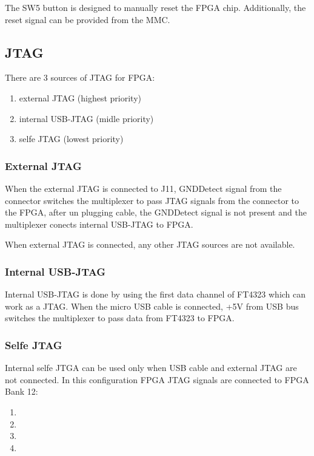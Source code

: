\documentclass[12pt,oneside,a4]{article}
\begin{document}
The SW5 button is designed to manually reset the FPGA chip. Additionally, the reset signal can be provided from the MMC. 

\subsection{JTAG}
There are 3 sources of JTAG for FPGA: 
\begin{enumerate}
	\item external JTAG (highest priority)
	\item internal USB-JTAG (midle priority)
	\item selfe JTAG (lowest  priority)
\end{enumerate}

\subsubsection{External JTAG}
When the external JTAG is connected to J11, GNDDetect signal from the connector switches the multiplexer to pass JTAG signals from the connector to the FPGA, after un plugging cable, the GNDDetect signal is not present and the multiplexer conects internal USB-JTAG to FPGA.

When external JTAG is connected, any other JTAG sources are not available.

\subsubsection{Internal USB-JTAG}
Internal USB-JTAG is done by using the first data channel of FT4323 which can work as a JTAG. When the micro USB cable is connected, +5V
from USB bus switches the multiplexer to pass data from FT4323 to FPGA. 

\subsubsection{Selfe JTAG}
Internal selfe JTGA can be used only when USB cable and external JTAG are not connected. In this configuration FPGA JTAG signals are connected to FPGA Bank 12:
\begin{enumerate}
	\item {}
	\item {}
	\item {}
	\item {}
\end{enumerate}
\end{document}
